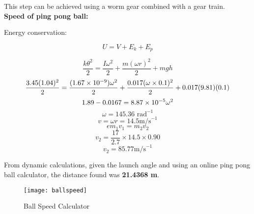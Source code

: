 \begin{homeworkProblem}
This step can be achieved using a worm gear combined with a gear train.\\

\textbf{Speed of ping pong ball:}

Energy conservation:

\begin{equation}
  U = V + E_k + E_p
\end{equation}

\begin{equation}
  \frac{k\theta^2}{2} = \frac{I\omega^2}{2} + \frac{m(\omega r)^2}{2} + mgh
\end{equation}
\begin{equation}
  \frac{3.45(1.04)^2}{2} = \frac{(1.67 \times 10^{-9})\omega^2}{2} + \frac{0.017(\omega \times 0.1)^2}{2} + 0.017(9.81)(0.1)
\end{equation}
\begin{equation}
  1.89 - 0.0167 = 8.87 \times 10^{-5} \omega^2
\end{equation}
\begin{equation}
  \omega = 145.36 \text{ rad}^{-1}
\end{equation}
\begin{equation}
  v = \omega r = 14.5 \text{m/s}^{-1}
\end{equation}
\begin{equation}
  e m_1 v_1 = m_2 v_2
\end{equation}
\begin{equation}
  v_2 = \frac{17}{2.7} \times 14.5 \times 0.90
\end{equation}
\begin{equation}
  v_2 = 85.77 \text{m/s}^{-1}
\end{equation}

From dynamic calculations, given the launch angle and using an online ping pong ball calculator, the distance found was \textbf{21.4368 m}.

\begin{figure}[H]
  \begin{center}
    \texttt{[image: ballspeed]}
    \caption{Ball Speed Calculator}
    \label{ballspeed}
  \end{center}
\end{figure}

\end{homeworkProblem}



